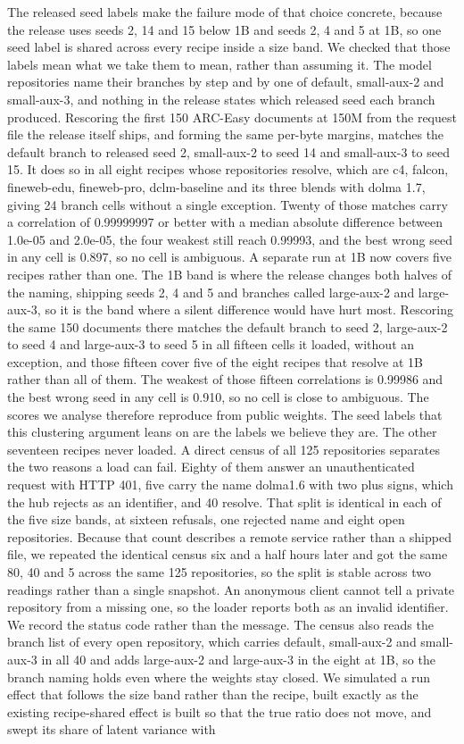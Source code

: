 The released seed labels make the failure mode of that choice concrete, because the release uses seeds 2, 14 and 15 below 1B and seeds 2, 4 and 5 at 1B, so one seed label is shared across every recipe inside a size band. We checked that those labels mean what we take them to mean, rather than assuming it. The model repositories name their branches by step and by one of default, small-aux-2 and small-aux-3, and nothing in the release states which released seed each branch produced. Rescoring the first 150 ARC-Easy documents at 150M from the request file the release itself ships, and forming the same per-byte margins, matches the default branch to released seed 2, small-aux-2 to seed 14 and small-aux-3 to seed 15. It does so in all eight recipes whose repositories resolve, which are c4, falcon, fineweb-edu, fineweb-pro, dclm-baseline and its three blends with dolma 1.7, giving 24 branch cells without a single exception. Twenty of those matches carry a correlation of 0.99999997 or better with a median absolute difference between 1.0e-05 and 2.0e-05, the four weakest still reach 0.99993, and the best wrong seed in any cell is 0.897, so no cell is ambiguous. A separate run at 1B now covers five recipes rather than one. The 1B band is where the release changes both halves of the naming, shipping seeds 2, 4 and 5 and branches called large-aux-2 and large-aux-3, so it is the band where a silent difference would have hurt most. Rescoring the same 150 documents there matches the default branch to seed 2, large-aux-2 to seed 4 and large-aux-3 to seed 5 in all fifteen cells it loaded, without an exception, and those fifteen cover five of the eight recipes that resolve at 1B rather than all of them. The weakest of those fifteen correlations is 0.99986 and the best wrong seed in any cell is 0.910, so no cell is close to ambiguous. The scores we analyse therefore reproduce from public weights. The seed labels that this clustering argument leans on are the labels we believe they are. The other seventeen recipes never loaded. A direct census of all 125 repositories separates the two reasons a load can fail. Eighty of them answer an unauthenticated request with HTTP 401, five carry the name dolma1.6 with two plus signs, which the hub rejects as an identifier, and 40 resolve. That split is identical in each of the five size bands, at sixteen refusals, one rejected name and eight open repositories. Because that count describes a remote service rather than a shipped file, we repeated the identical census six and a half hours later and got the same 80, 40 and 5 across the same 125 repositories, so the split is stable across two readings rather than a single snapshot. An anonymous client cannot tell a private repository from a missing one, so the loader reports both as an invalid identifier. We record the status code rather than the message. The census also reads the branch list of every open repository, which carries default, small-aux-2 and small-aux-3 in all 40 and adds large-aux-2 and large-aux-3 in the eight at 1B, so the branch naming holds even where the weights stay closed. We simulated a run effect that follows the size band rather than the recipe, built exactly as the existing recipe-shared effect is built so that the true ratio does not move, and swept its share of latent variance with 